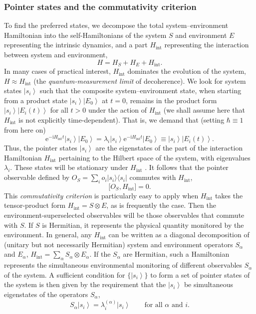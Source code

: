 \documentclass[aps,pra,reprint,amsmath,amssymb,showpacs,nofootinbib,floatfix,onecolumn,12pt]{revtex4-1}
\newcommand{\ket}[1]{\left\vert{#1}\right\rangle}
\newcommand{\ketbra}[2]{\ensuremath{|{#1 \rangle}{\langle #2}|}}
\newcommand{\E}{\text{e}}
\newcommand{\I}{\text{i}}
\begin{document}
\subsubsection{Pointer states and the commutativity criterion}

To find the preferred states, we decompose the total system--environment Hamiltonian into the self-Hamiltonians of the system $S$ and environment $E$ representing the intrinsic dynamics, and a part $H_\text{int}$ representing the interaction between system and environment, 
%
\begin{equation}
H = H_S + H_E + H_\text{int}. 
\end{equation}
%
In many cases of practical interest, $H_\text{int}$ dominates the evolution of the system, $H \approx H_\text{int}$ (the \emph{quantum-measurement limit} of decoherence). We look for system states $\ket{s_i}$ such that the composite system--environment state, when starting from a product state $\ket{s_i}\ket{E_0}$ at $t=0$, remains in the product form $\ket{s_i}\ket{E_i(t)}$ for all $t>0$ under the action of $H_\text{int}$ (we shall assume here that $H_\text{int}$ is not explicitly time-dependent). That is, we demand that (setting $\hbar \equiv 1$ from here on)
%
\begin{equation}
  \label{eq:gxlknn98ygya24}
  \E^{-\I H_\text{int} t} \ket{s_i}\ket{E_0}=
  \lambda_i \ket{s_i}\E^{-\I H_\text{int} t} \ket{E_0} \equiv  \ket{s_i}\ket{E_i(t)}.
\end{equation}
%
Thus, the pointer states $\ket{s_i}$ are the eigenstates of the part of the interaction Hamiltonian $H_\text{int}$ pertaining to the Hilbert space of the system, with eigenvalues $\lambda_i$. These states will be stationary under $H_\text{int}$ \cite{Zurek:1981:dd}. It follows that the pointer observable defined by $O_S = \sum_i o_i \ketbra{s_i}{s_i}$ commutes with $H_\text{int}$,
%
\begin{equation}
  \label{eq:dhvvsdnbbfvs27}
  \bigl[ O_S, H_\text{int} \bigr] = 0.
\end{equation}
%
This \emph{commutativity criterion} \cite{Zurek:1981:dd,Zurek:1982:tv} is particularly easy to apply when $H_\text{int}$ takes the tensor-product form $H_\text{int} = S \otimes E$, as is frequently the case. Then the environment-superselected observables will be those observables that commute with $S$. If $S$ is Hermitian, it represents the physical quantity monitored by the environment. In general, any $H_\text{int}$ can be written as a diagonal decomposition of (unitary but not necessarily Hermitian) system and environment operators $S_\alpha$ and $E_\alpha$, $H_\text{int} =  \sum_\alpha S_\alpha \otimes E_\alpha$.
If the $S_\alpha$ are Hermitian, such a Hamiltonian represents the simultaneous environmental monitoring of different observables $S_\alpha$ of the system. A sufficient condition for $\{ \ket{s_i} \}$ to form a set of pointer states of the system is then given by the requirement that the $\ket{s_i}$ be simultaneous
eigenstates of the operators $S_\alpha$, 
%
\begin{equation}
  \label{eq:OIbvsrhjkbv9}
  S_\alpha \ket{s_i} = \lambda_i^{(\alpha)}\ket{s_i} \qquad
  \text{for all $\alpha$ and $i$}. 
\end{equation}
% 
\end{document}
